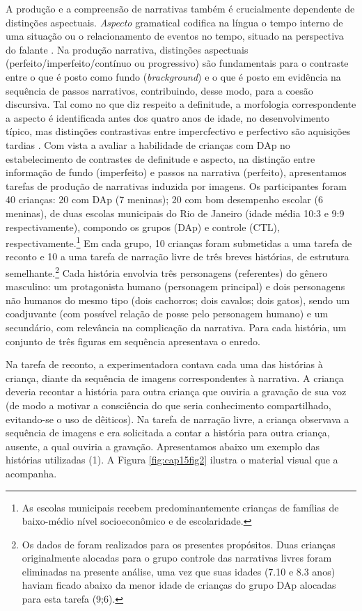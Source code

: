 \documentclass[output=paper,colorlinks,citecolor=brown,booklanguage=portuguese]{langscibook}
\begin{document}
A produção e a compreensão de narrativas também é crucialmente dependente de distinções aspectuais. \emph{Aspecto} gramatical codifica na língua o tempo interno de uma situação ou o relacionamento de eventos no tempo, situado na perspectiva do falante \citep{Comrie1976, Kazanina2007}. Na produção narrativa, distinções aspectuais (perfeito/imperfeito/contínuo ou progressivo) são fundamentais para o contraste entre o que é posto como fundo (\emph{brackground}) e o que é posto em evidência na sequência de passos narrativos, contribuindo, desse modo, para a coesão discursiva. Tal como no que diz respeito a definitude, a morfologia correspondente a aspecto é identificada antes dos quatro anos de idade, no desenvolvimento típico, mas distinções contrastivas entre impercfectivo e perfectivo são aquisições tardias \citep{Hickmann1999, McShane1988, Rodrigues2007}.
Com vista a avaliar a habilidade de crianças com DAp no estabelecimento de contrastes de definitude e aspecto, na distinção entre informação de fundo (imperfeito) e passos na narrativa (perfeito), apresentamos tarefas de produção de narrativas induzida por imagens. Os participantes foram 40 crianças: 20 com DAp (7 meninas); 20 com bom desempenho escolar (6 meninas), de duas escolas municipais do Rio de Janeiro (idade média 10:3 e 9:9 respectivamente), compondo os grupos (DAp) e controle (CTL), respectivamente.\footnote{As escolas municipais recebem predominantemente crianças de famílias de baixo-médio nível socioeconômico e de escolaridade.} Em cada grupo, 10 crianças foram submetidas a uma tarefa de reconto e 10 a uma tarefa de narração livre de três breves histórias, de estrutura semelhante.\footnote{Os dados de \citet{Longchamps2014} foram realizados para os presentes propósitos. Duas crianças originalmente alocadas para o grupo controle das narrativas livres foram eliminadas na presente análise, uma vez que suas idades (7.10 e 8.3 anos) haviam ficado abaixo da menor idade de crianças do grupo DAp alocadas para esta tarefa (9;6).} Cada história envolvia três personagens (referentes) do gênero masculino: um protagonista humano (personagem principal) e dois personagens não humanos do mesmo tipo (dois cachorros; dois cavalos; dois gatos), sendo um coadjuvante (com possível relação de posse pelo personagem humano) e um secundário, com relevância na complicação da narrativa. Para cada história, um conjunto de três figuras em sequência apresentava o enredo. 

Na tarefa de reconto, a experimentadora contava cada uma das histórias à criança, diante da sequência de imagens correspondentes à narrativa. A criança deveria recontar a história para outra criança que ouviria a gravação de sua voz (de modo a motivar a consciência do que seria conhecimento compartilhado, evitando-se o uso de dêiticos). Na tarefa de narração livre, a criança observava a sequência de imagens e era solicitada a contar a história para outra criança, ausente, a qual ouviria a gravação. Apresentamos abaixo um exemplo das histórias utilizadas (1). A Figura \ref{fig:cap15fig2} ilustra o material visual que a acompanha. 
%
%
\end{document}
